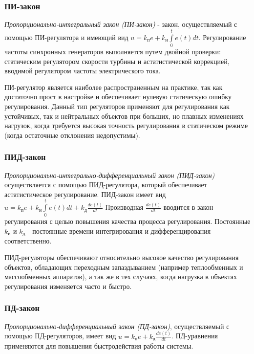 \documentclass[../../TAU.tex]{subfiles}
\begin{document}
\subsubsection{ПИ-закон}

    {\it Пропорционально-интегральный закон (ПИ-закон)} - закон, осуществляемый с помощью ПИ-регулятора и имеющий вид $u=k_\text{п}e+ k_\text{и}\int\limits_0^t e(t) dt$.  Регулирование частоты синхронных генераторов выполняется путем двойной проверки: статическим регулятором скорости турбины и астатистической коррекцией, вводимой регулятором частоты электрического тока. \par
    ПИ-регулятор является наиболее распространенным на практике, так как достаточно прост в настройке и обеспечивает нулевую статическую ошибку регулирования. Данный тип регуляторов применяют для регулирования как устойчивых, так и нейтральных объектов при больших, но плавных изменениях нагрузок, когда требуется высокая точность регулирования в статическом режиме (когда остаточные отклонения недопустимы).


\subsubsection{ПИД-закон}

    {\it Пропорционально-интегрально-дифференциальный закон (ПИД-закон)} осуществляется с помощью ПИД-регулятора, который обеспечивает астатистическое регулирование. ПИД-закон имеет вид $u=k_\text{п}e+ k_\text{и}\int\limits_0^t e(t) dt +k_\text{д} \frac{de(t)}{dt}$ Производная $\frac{d e(t)}{dt}$ вводится в закон регулирования с целью повышения качества процесса регулирования. Постоянные $k_\text{и}$ и $k_\text{д}$ - постоянные времени интегрирования и дифференцирования соответственно.
    
    ПИД-регуляторы обеспечивают относительно высокое качество регулирования объектов, обладающих переходным запаздыванием (например теплообменных и массообменных аппаратов), а так же в тех случаях, когда нагрузка в объектах регулирования изменяется часто и быстро.


\subsubsection{ПД-закон}

    {\it Пропорционально-дифференциальный закон (ПД-закон)}, осуществляемый с помощью ПД-регуляторов, имеет вид $u=k_\text{п}e+ k_\text{д} \frac{de(t)}{dt}$. ПД-уравнения применяются для повышения быстродействия работы системы.
\end{document}
